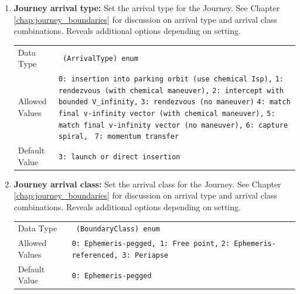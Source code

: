     \begin{enumerate}


    \item \textbf{Journey arrival type:} Set the arrival type for the Journey. See Chapter \ref{chap:journey_boundaries} for discussion on arrival type and arrival class combinations. Reveals additional options depending on setting.

        \begin{table}[H]
            \hspace{2cm}
            \begin{tabular}{lp{3cm}}
            Data Type & \verb| (ArrivalType) enum| \\
            Allowed Values & \verb|0: insertion into parking orbit (use chemical Isp),| \newline 
            \verb|1: rendezvous (with chemical maneuver),| \newline 
            \verb|2: intercept with bounded V_infinity,| \newline 
            \verb|3: rendezvous (no maneuver)| \newline 
            \verb|4: match final v-infinity vector (with chemical maneuver),| \newline 
            \verb|5: match final v-infinity vector (no maneuver),| \newline
            \verb|6: capture spiral, |\newline
            \verb|7: momentum transfer|\\
            Default Value & \verb|3: launch or direct insertion |\\
            \end{tabular}
        \end{table}

    \item \textbf{Journey arrival class:} Set the arrival class for the Journey. See Chapter \ref{chap:journey_boundaries} for discussion on arrival type and arrival class combinations. Reveals additional options depending on setting.
        \begin{table}[H]
            \hspace{2cm}
            \begin{tabular}{lp{3cm}}
            Data Type & \verb| (BoundaryClass) enum| \\
            Allowed Values & \verb|0: Ephemeris-pegged, 1: Free point,| \newline 
            \verb|2: Ephemeris-referenced, 3: Periapse|\\
            Default Value & \verb|0: Ephemeris-pegged|\\
            \end{tabular}
        \end{table}


\end{enumerate}
